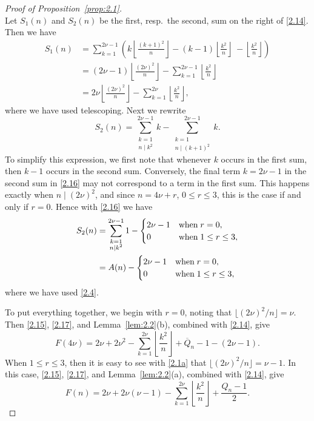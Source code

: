 \documentclass{amsart}
\theoremstyle{plain}
\numberwithin{equation}{section}
\begin{document}
\begin{proof}[Proof of Proposition~\ref{prop:2.1}]
\begin{equation}
\end{equation}
Let $S_1(n)$ and $S_2(n)$ be the first, resp.\ the second, sum on the right of
\eqref{2.14}. Then we have
\begin{align}
S_1(n)&=\sum_{k=1}^{2\nu-1}\left(k\left\lfloor{\frac{(k+1)^2}{n}}\right\rfloor
-(k-1)\left\lfloor{\frac{k^2}{n}}\right\rfloor\
-\left\lfloor{\frac{k^2}{n}}\right\rfloor\right)\label{2.15}\\
&=(2\nu-1)\left\lfloor{\frac{(2\nu)^2}{n}}\right\rfloor
-\sum_{k=1}^{2\nu-1}\left\lfloor{\frac{k^2}{n}}\right\rfloor\nonumber\\
&=2\nu\left\lfloor{\frac{(2\nu)^2}{n}}\right\rfloor
-\sum_{k=1}^{2\nu}\left\lfloor{\frac{k^2}{n}}\right\rfloor,\nonumber
\end{align}
where we have used telescoping. Next we rewrite
\begin{equation}\label{2.16}
S_2(n) = \sum_{\substack{k=1\\n\mid k^2}}^{2\nu-1}k
-\sum_{\substack{k=1\\n\mid(k+1)^2}}^{2\nu-1}k.
\end{equation} 
To simplify this expression, we first note that whenever $k$ occurs in the
first sum, then $k-1$ occurs in the second sum. Conversely, the final term
$k=2\nu-1$ in the second sum in \eqref{2.16} may not correspond to a term in
the first sum. This happens exactly when $n\mid(2\nu)^2$, and since 
$n=4\nu+r$, $0\leq r\leq 3$, this is the case if and only if $r=0$. Hence with
\eqref{2.16} we have 
\begin{align}
S_2(n) &= \sum_{\substack{k=1\\n\mid k^2}}^{2\nu-1}1 - \begin{cases}
2\nu-1&\hbox{when}\;r=0,\\
0&\hbox{when}\;1\leq r\leq 3,
\end{cases}\label{2.17}\\
&= A(n)  - \begin{cases}
2\nu-1&\hbox{when}\;r=0,\\
0&\hbox{when}\;1\leq r\leq 3,
\end{cases}\nonumber
\end{align}
where we have used \eqref{2.4}.

To put everything together, we begin with $r=0$, noting that
$\lfloor(2\nu)^2/n\rfloor=\nu$. Then \eqref{2.15}, \eqref{2.17}, and 
Lemma~\ref{lem:2.2}(b), combined with \eqref{2.14}, give
\begin{equation}\label{2.18}
F(4\nu)=2\nu+2\nu^2-\sum_{k=1}^{2\nu}\left\lfloor{\frac{k^2}{n}}\right\rfloor
+\overline{Q}_n-1-(2\nu-1).
\end{equation}
When $1\leq r\leq 3$, then it is easy to see with \eqref{2.1a} that 
$\lfloor(2\nu)^2/n\rfloor=\nu-1$. In this case, \eqref{2.15}, \eqref{2.17},
and Lemma~\ref{lem:2.2}(a), combined with \eqref{2.14}, give
\begin{equation}\label{2.19}
F(n)=2\nu+2\nu(\nu-1)-\sum_{k=1}^{2\nu}\left\lfloor{\frac{k^2}{n}}\right\rfloor
+\frac{Q_n-1}{2}.
\end{equation}


\end{proof}
\end{document}
